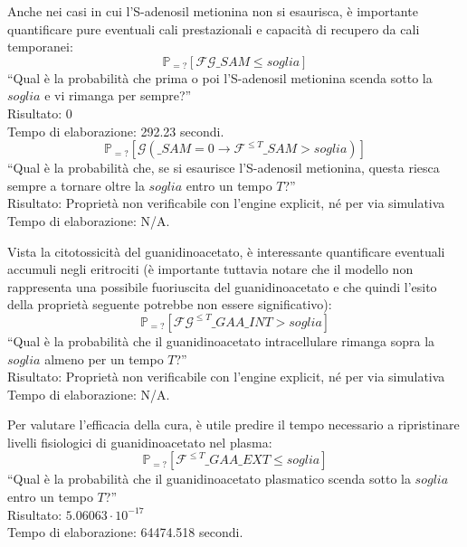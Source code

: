 Anche nei casi in cui l'S-adenosil metionina non si esaurisca, \`e importante quantificare pure eventuali cali prestazionali e capacit\`a di recupero da cali temporanei:
\begin{equation}
\mathbb{P}_{=?} [\mathcal{F} \mathcal{G} \_SAM \leq soglia]
\end{equation}
``Qual \`e la probabilit\`a che prima o poi l'S-adenosil metionina scenda sotto la $soglia$ e vi rimanga per sempre?''\\
Risultato: 0\\
Tempo di elaborazione: 292.23 secondi.
\begin{equation}
\mathbb{P}_{=?} [\mathcal{G} (\_SAM = 0 \rightarrow \mathcal{F}^{\leq T} \_SAM > soglia)]
\end{equation}
``Qual \`e la probabilit\`a che, se si esaurisce l'S-adenosil metionina, questa riesca sempre a tornare oltre la $soglia$ entro un tempo $T$?''\\
Risultato: Propriet\`a non verificabile con l'engine explicit, n\'e per via simulativa\\
Tempo di elaborazione: N/A.

Vista la citotossicit\`a del guanidinoacetato, \`e interessante quantificare eventuali accumuli negli eritrociti (\`e importante tuttavia notare che il modello non rappresenta una possibile fuoriuscita del guanidinoacetato e che quindi l'esito della propriet\`a seguente potrebbe non essere significativo):
\begin{equation}
\mathbb{P}_{=?} [\mathcal{F}\mathcal{G}^{\leq T} \_GAA\_INT > soglia]
\end{equation}
``Qual \`e la probabilit\`a che il guanidinoacetato intracellulare rimanga sopra la $soglia$ almeno per un tempo $T$?''\\
Risultato: Propriet\`a non verificabile con l'engine explicit, n\'e per via simulativa\\
Tempo di elaborazione: N/A.

Per valutare l'efficacia della cura, \`e utile predire il tempo necessario a ripristinare livelli fisiologici di guanidinoacetato nel plasma:
\begin{equation}
\mathbb{P}_{=?} [\mathcal{F}^{\leq T} \_GAA\_EXT \leq soglia]
\end{equation}
``Qual \`e la probabilit\`a che il guanidinoacetato plasmatico scenda sotto la $soglia$ entro un tempo $T$?''\\
Risultato: $5.06063 \cdot 10^{-17}$\\
Tempo di elaborazione: 64474.518 secondi.
\\\\